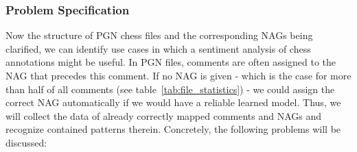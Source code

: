\documentclass[article,type=msc,colorback,accentcolor=tud7b]{tudthesis}
\begin{document}
  \subsubsection{Problem Specification}
  \label{subsec:problem_specification}
    Now the structure of PGN chess files and the corresponding NAGs being clarified, we can identify use cases in which a sentiment analysis of chess annotations might be useful. In PGN files, comments are often assigned to the NAG that precedes this comment. If no NAG is given - which is the case for more than half of all comments (see table~\ref{tab:file_statistics}) - we could assign the correct NAG automatically if we would have a reliable learned model. Thus, we will collect the data of already correctly mapped comments and NAGs and recognize contained patterns therein. Concretely, the following problems will be discussed:
\end{document}
